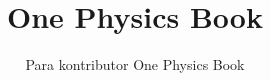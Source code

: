 \documentclass[11pt,a4paper,twoside,openany]{book}
\title{One Physics Book}
\author{Para kontributor One Physics Book}
\date{\bookdate}
\begin{document}
\frontmatter




\tableofcontents

\mainmatter



\appendix
\part{\omsolutionspart}


\backmatter
\printindex
\end{document}
